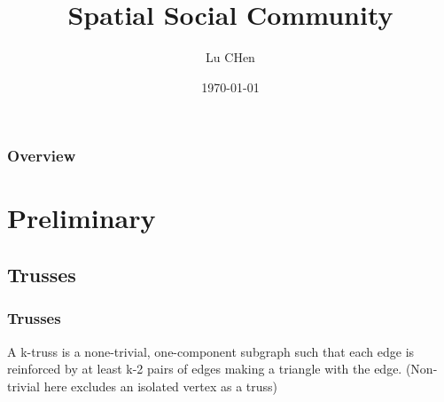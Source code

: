 \documentclass{beamer}
\title[Short title]{Spatial Social Community} %
\author{Lu CHen} %
\institute[FSET] %
{
Swinburne University of Technology \\ %
\medskip
\textit{luchen@swin.edu.au} %
}
\date{\today} %
\begin{document}
\begin{frame}
\titlepage %
\end{frame}

\begin{frame}
\frametitle{Overview} %
\tableofcontents %
\end{frame}


\section{Preliminary} %
\subsection{Trusses} %

\begin{frame}
\frametitle{Trusses}
\begin{definition}
A k-truss is a none-trivial, one-component subgraph such that each edge is reinforced by at least k-2 pairs of edges making a triangle with the edge. (Non-trivial here excludes an isolated vertex as a truss)
\end{definition}
\end{frame}

\end{document}
